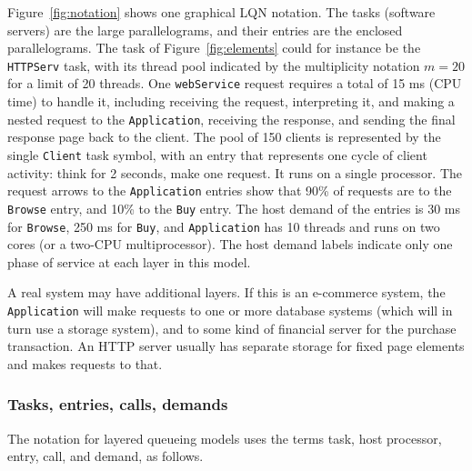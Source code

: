 \documentclass[11pt]{article}
\begin{document}
Figure~\ref{fig:notation} shows one graphical LQN notation. The tasks (software servers) are the
large parallelograms, and their entries are the enclosed parallelograms. The task of Figure~\ref{fig:elements} could for
instance be the \texttt{HTTPServ} task, with its thread pool indicated by the multiplicity notation $m=20$
for a limit of 20 threads. One \texttt{webService} request requires a total of 15 ms (CPU time) to
handle it, including receiving the request, interpreting it, and making a nested request to the
\texttt{Application}, receiving the response, and sending the final response page back to the
client. The pool of 150 clients is represented by the single \texttt{Client} task symbol, with an entry
that represents one cycle of client activity: think for 2 seconds, make one request. It runs on
a single processor. The request arrows to the \texttt{Application} entries show that 90\% of requests
are to the \texttt{Browse} entry, and 10\% to the \texttt{Buy} entry. The host demand of the entries is 30 ms for
\texttt{Browse}, 250 ms for \texttt{Buy}, and \texttt{Application} has 10 threads and runs on two cores (or a two-CPU
multiprocessor). The host demand labels indicate only one phase of service at each layer in
this model.

A real system may have additional layers. If this is an e-commerce system, the \texttt{Application}
will make requests to one or more database systems (which will in turn use a storage system), and
to some kind of financial server for the purchase transaction. An HTTP server usually has separate
storage for fixed page elements and makes requests to that.

\subsubsection{Tasks, entries, calls, demands}
\label{sec:tasks-entries-calls-demands}

The notation for layered queueing models uses the terms task, host processor, entry, call, 
and demand, as follows.
\end{document}
